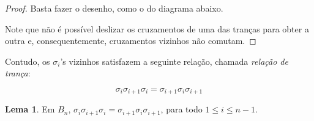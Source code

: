 \documentclass[a4paper,portuguese,11pt,twoside, leqno]{book}
\makeatletter
\newcounter{braid}
\newcounter{strands}
\def\cross{%
	\@ifnextchar^{\message{Got sup}\cross@sup}{\cross@sub}}
\def\cross@sup^#1_#2{\render@cross{#2}{#1}}
\def\cross@sub_#1{\@ifnextchar^{\cross@@sub{#1}}{\render@cross{#1}{1}}}
\def\cross@@sub#1^#2{\render@cross{#1}{#2}}
\def\render@cross#1#2{
	\def\strand{#1}
	\def\crossing{#2}
	\pgfmathsetmacro{\cross@y}{-\value{braid}*\braid@h}
	\pgfmathtruncatemacro{\nextstrand}{#1+1}
	\foreach \thread in {1,...,\value{strands}}
	{
		\pgfmathsetmacro{\strand@x}{\thread * \braid@w}
		\ifnum\thread=\strand
		\pgfmathsetmacro{\over@x}{\strand * \braid@w + .5*(1 - \crossing) * \braid@w}
		\pgfmathsetmacro{\under@x}{\strand * \braid@w + .5*(1 + \crossing) * \braid@w}
		\draw[braid] \pgfkeysvalueof{/tikz/braid start} +(\under@x pt,\cross@y pt) to[out=-90,in=90] +(\over@x pt,\cross@y pt -\braid@h);
		\draw[braid] \pgfkeysvalueof{/tikz/braid start} +(\over@x pt,\cross@y pt) to[out=-90,in=90] +(\under@x pt,\cross@y pt -\braid@h);
		\else
		\ifnum\thread=\nextstrand
		\else
		\draw[braid] \pgfkeysvalueof{/tikz/braid start} ++(\strand@x pt,\cross@y pt) -- ++(0,-\braid@h);
		\fi
		\fi
	}
	\stepcounter{braid}
}
\newcommand{\braid}[2][]{%
	\begingroup
	\pgfkeys{/tikz/strands=2}
	\tikzset{#1}
	\pgfkeysgetvalue{/tikz/braid width}{\braid@w}
	\pgfkeysgetvalue{/tikz/braid height}{\braid@h}
	\setcounter{braid}{0}
	\let\sigma=\cross
	#2
	\endgroup
}
\theoremstyle{definition}
\newtheorem{lemma}[theorem]{Lema}
\makeatother
\begin{document}
	\begin{proof}
		Basta fazer o desenho, como o do diagrama abaixo.%
		
		\begin{center}
		\end{center}
		
		\par\vspace{0.3cm} Note que não é possível deslizar os cruzamentos de uma das tranças para obter a outra e, consequentemente, cruzamentos vizinhos não comutam. 
		
	\end{proof}
	
	\par\vspace{0.3cm} Contudo, os $\sigma_i$'s vizinhos satisfazem a seguinte relação, chamada \textit{relação de trança}:
	
	\begin{equation*}
	\sigma_i\sigma_{i+1}\sigma_i = \sigma_{i+1}\sigma_i\sigma_{i+1}
	\end{equation*}
	
	\par\vspace{0.3cm} 
	
	\begin{lemma}
		Em $B_n$, $\sigma_i\sigma_{i+1}\sigma_i = \sigma_{i+1}\sigma_i\sigma_{i+1}$, para todo $1\leq i\leq n-1$. 
	\end{lemma}
	
\end{document}
